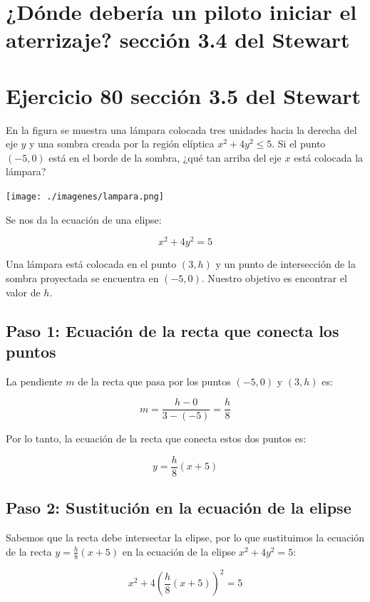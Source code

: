 \documentclass[11pt,letterpaper]{article}
\begin{document}
\section*{¿Dónde debería un piloto iniciar el aterrizaje? sección 3.4 del Stewart }
\section*{Ejercicio 80 sección 3.5 del Stewart}

En la figura se muestra una lámpara colocada tres unidades hacia la derecha del eje \( y \) y una sombra creada por la región elíptica \( x^2 + 4y^2 \leq 5 \). Si el punto \( (-5, 0) \) está en el borde de la sombra, ¿qué tan arriba del eje \( x \) está colocada la lámpara?

\begin{center}
    \texttt{[image: ./imagenes/lampara.png]}
\end{center}

Se nos da la ecuación de una elipse:

\[
x^2 + 4y^2 = 5
\]

Una lámpara está colocada en el punto \( (3, h) \) y un punto de intersección de la sombra proyectada se encuentra en \( (-5, 0) \). Nuestro objetivo es encontrar el valor de \(h\).

\subsection{Paso 1: Ecuación de la recta que conecta los puntos}

La pendiente \(m\) de la recta que pasa por los puntos \( (-5, 0) \) y \( (3, h) \) es:

\[
m = \frac{h - 0}{3 - (-5)} = \frac{h}{8}
\]

Por lo tanto, la ecuación de la recta que conecta estos dos puntos es:

\[
y = \frac{h}{8}(x + 5)
\]

\subsection*{Paso 2: Sustitución en la ecuación de la elipse}

Sabemos que la recta debe intersectar la elipse, por lo que sustituimos la ecuación de la recta \( y = \frac{h}{8}(x + 5) \) en la ecuación de la elipse \( x^2 + 4y^2 = 5 \):

\[
x^2 + 4\left( \frac{h}{8}(x + 5) \right)^2 = 5
\]
\end{document}
